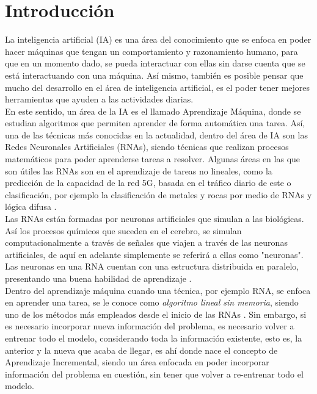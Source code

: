 \chapter{Introducción}

	
    La inteligencia artificial (IA) es una área del conocimiento que se enfoca en poder hacer máquinas 
    que tengan un comportamiento y razonamiento humano, para que en un momento dado, se pueda interactuar con 
    ellas sin darse cuenta que se est\'a interactuando con una máquina. Así mismo, también es posible 
    pensar que mucho del desarrollo en el área de inteligencia artificial, es el poder tener 
    mejores herramientas que ayuden a las actividades diarias.\\

    En este sentido, un área de la IA es el llamado Aprendizaje Máquina, donde se estudian algoritmos
    que permiten aprender de forma automática una tarea. Así, una de las técnicas más conocidas en la 
    actualidad, dentro del área de IA son las Redes Neuronales Artificiales (RNAs), siendo técnicas que 
    realizan procesos matemáticos para poder aprenderse tareas a resolver. Algunas áreas en las que
    son útiles las RNAs son en el aprendizaje de tareas no lineales, como la predicción de
    la capacidad de la red 5G, basada en el tráfico diario de este \cite{zhao2022} o clasificación, por ejemplo 
    la clasificación de metales y rocas por medio de RNAs y lógica difusa \cite{salazar2013}.\\

    Las RNAs están formadas por neuronas artificiales que simulan a las biológicas. Así los procesos
    químicos que suceden en el cerebro, se simulan computacionalmente a través de señales que viajen
    a través de las neuronas artificiales, de aquí en adelante simplemente se referirá a ellas como 
    "neuronas". Las neuronas en una RNA cuentan con una estructura distribuida en paralelo, presentando 
    una buena habilidad de aprendizaje \cite{liu2015}.\\

    Dentro del aprendizaje máquina cuando una técnica, por ejemplo RNA, se enfoca en aprender una tarea, se le 
    conoce como \textit{algoritmo lineal sin memoria}, siendo uno de los métodos más empleados desde el
    inicio de las RNAs \cite{GiraudCarrier2000}. Sin embargo, si es necesario incorporar nueva
    información del problema,  es necesario volver a entrenar todo el modelo, considerando toda 
    la información existente, esto es, la anterior y la nueva que acaba de llegar, es ahí donde nace el
    concepto de Aprendizaje Incremental, siendo un área enfocada en poder incorporar información 
    del problema en cuestión, sin tener que volver a re-entrenar todo el modelo.\\


